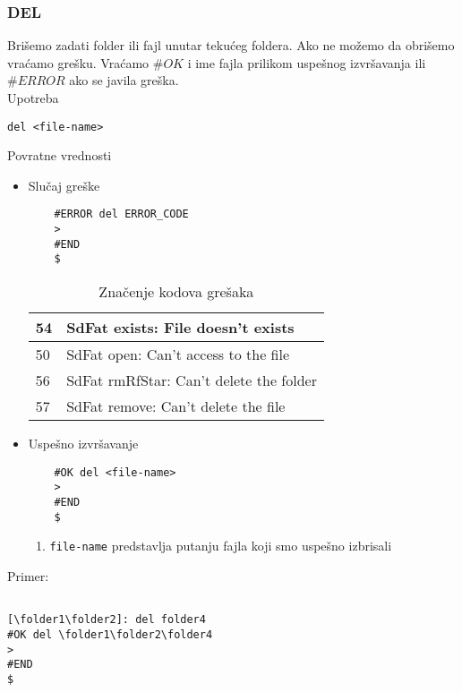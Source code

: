 \documentclass[a4paper]{extarticle}
\begin{document}
\subsubsection{DEL}
Brišemo zadati folder ili fajl unutar tekućeg foldera. Ako ne možemo da obrišemo vraćamo grešku.
Vraćamo $\#OK$ i ime fajla prilikom uspešnog izvršavanja ili $\#ERROR$ ako se javila greška.\\
Upotreba
\begin{verbatim}
del <file-name>
\end{verbatim}
Povratne vrednosti
\begin{itemize}
	\item Slučaj greške\\
	\begin{verbatim}
	#ERROR del ERROR_CODE
	>
	#END
	$
	\end{verbatim}
	\begin{table}[h]
		\centering
		\begin{tabular}{|l|l|}
			\hline
			54 & SdFat exists: File doesn't exists       \\ \hline
			50 & SdFat open: Can't access to the file    \\ \hline
			56 & SdFat rmRfStar: Can't delete the folder \\ \hline
			57 & SdFat remove: Can't delete the file     \\ \hline
		\end{tabular}
		\caption{Značenje kodova grešaka}
		\label{tab:my-table}
	\end{table}
	\item Uspešno izvršavanje\\
	\begin{verbatim}
	#OK del <file-name>
	>
	#END
	$
	\end{verbatim}
	\begin{enumerate}
		\item \verb|file-name| predstavlja putanju fajla koji smo uspešno izbrisali
	\end{enumerate}
\end{itemize}
Primer:
\begin{verbatim}

[\folder1\folder2]: del folder4
#OK del \folder1\folder2\folder4
>
#END
$
\end{verbatim}
\end{document}
